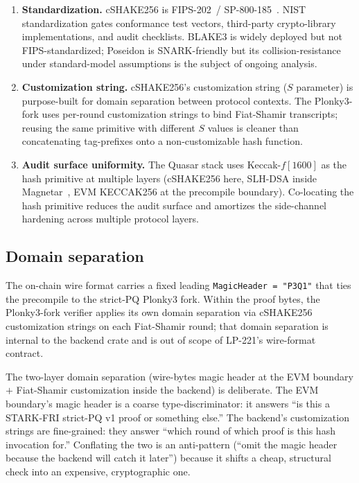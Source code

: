 \begin{enumerate}[leftmargin=2em,nosep]
\item \textbf{Standardization.} cSHAKE256 is FIPS-202~/
  SP-800-185~\cite{fips202,sp800185}. NIST standardization gates
  conformance test vectors, third-party crypto-library
  implementations, and audit checklists. BLAKE3 is widely deployed
  but not FIPS-standardized; Poseidon is SNARK-friendly but its
  collision-resistance under standard-model assumptions is the
  subject of ongoing analysis.
\item \textbf{Customization string.} cSHAKE256's customization
  string ($S$ parameter) is purpose-built for domain separation
  between protocol contexts. The Plonky3-fork uses per-round
  customization strings to bind Fiat-Shamir transcripts;
  reusing the same primitive with different $S$ values is
  cleaner than concatenating tag-prefixes onto a non-customizable
  hash function.
\item \textbf{Audit surface uniformity.} The Quasar stack uses
  Keccak-$f[1600]$ as the hash primitive at multiple layers
  (cSHAKE256 here, SLH-DSA inside Magnetar~\cite{fips205}, EVM
  KECCAK256 at the precompile boundary). Co-locating the hash
  primitive reduces the audit surface and amortizes the
  side-channel hardening across multiple protocol layers.
\end{enumerate}

\subsection{Domain separation}

The on-chain wire format carries a fixed leading
\texttt{MagicHeader = "P3Q1"} that ties the precompile to the
strict-PQ Plonky3 fork. Within the proof bytes, the Plonky3-fork
verifier applies its own domain separation via cSHAKE256
customization strings on each Fiat-Shamir round; that domain
separation is internal to the backend crate and is out of scope of
LP-221's wire-format contract.

The two-layer domain separation (wire-bytes magic header at the
EVM boundary $+$ Fiat-Shamir customization inside the backend) is
deliberate. The EVM boundary's magic header is a coarse
type-discriminator: it answers ``is this a STARK-FRI strict-PQ v1
proof or something else.'' The backend's customization strings are
fine-grained: they answer ``which round of which proof is this
hash invocation for.'' Conflating the two is an anti-pattern
(``omit the magic header because the backend will catch it later'')
because it shifts a cheap, structural check into an expensive,
cryptographic one.

